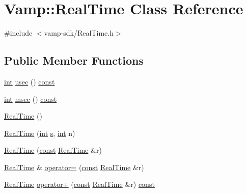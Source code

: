 \hypertarget{struct_vamp_1_1_real_time}{}\section{Vamp\+:\+:Real\+Time Class Reference}
\label{struct_vamp_1_1_real_time}


{\ttfamily \#include $<$vamp-\/sdk/\+Real\+Time.\+h$>$}

\subsection*{Public Member Functions}
\begin{DoxyCompactItemize}
\item 
\hyperlink{xmltok_8h_a5a0d4a5641ce434f1d23533f2b2e6653}{int} \hyperlink{struct_vamp_1_1_real_time_aace9e2c60af62273e45ccd98d623914c}{usec} () \hyperlink{getopt1_8c_a2c212835823e3c54a8ab6d95c652660e}{const} 
\item 
\hyperlink{xmltok_8h_a5a0d4a5641ce434f1d23533f2b2e6653}{int} \hyperlink{struct_vamp_1_1_real_time_a76e22815db51ae180c38021110da9947}{msec} () \hyperlink{getopt1_8c_a2c212835823e3c54a8ab6d95c652660e}{const} 
\item 
\hyperlink{struct_vamp_1_1_real_time_ad703be11b7beb07af08ddf133aa2ae79}{Real\+Time} ()
\item 
\hyperlink{struct_vamp_1_1_real_time_a75b2f0af2f9c49e649f8d30b452b049d}{Real\+Time} (\hyperlink{xmltok_8h_a5a0d4a5641ce434f1d23533f2b2e6653}{int} \hyperlink{lib_2expat_8h_a755339d27872b13735c2cab829e47157}{s}, \hyperlink{xmltok_8h_a5a0d4a5641ce434f1d23533f2b2e6653}{int} n)
\item 
\hyperlink{struct_vamp_1_1_real_time_a8f4dbd8ef24a0ec6a77dce67fff5434e}{Real\+Time} (\hyperlink{getopt1_8c_a2c212835823e3c54a8ab6d95c652660e}{const} \hyperlink{struct_vamp_1_1_real_time}{Real\+Time} \&r)
\item 
\hyperlink{struct_vamp_1_1_real_time}{Real\+Time} \& \hyperlink{struct_vamp_1_1_real_time_adb82f838804a9a3ad49988de5944d090}{operator=} (\hyperlink{getopt1_8c_a2c212835823e3c54a8ab6d95c652660e}{const} \hyperlink{struct_vamp_1_1_real_time}{Real\+Time} \&r)
\item 
\hyperlink{struct_vamp_1_1_real_time}{Real\+Time} \hyperlink{struct_vamp_1_1_real_time_a6b74748d1eb4c3c751e7a12aefae0bde}{operator+} (\hyperlink{getopt1_8c_a2c212835823e3c54a8ab6d95c652660e}{const} \hyperlink{struct_vamp_1_1_real_time}{Real\+Time} \&r) \hyperlink{getopt1_8c_a2c212835823e3c54a8ab6d95c652660e}{const} 

\end{DoxyCompactItemize}
